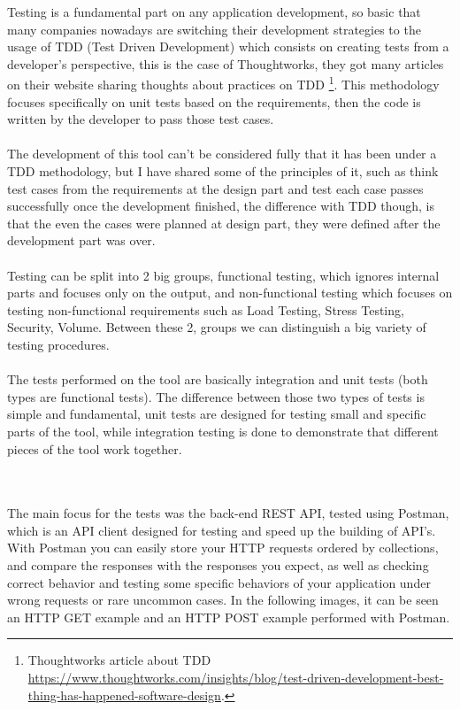 \documentclass{article}
\begin{document}
Testing is a fundamental part on any application development, so basic that many companies nowadays are switching their development strategies to the usage of \gls{TDD} (Test Driven Development) which consists on creating tests from a developer’s perspective, this is the case of Thoughtworks, they got many articles on their website sharing thoughts about practices on TDD \footnote{Thoughtworks article about TDD  \url{https://www.thoughtworks.com/insights/blog/test-driven-development-best-thing-has-happened-software-design}.}. This  methodology  focuses  specifically  on  unit  tests based on the requirements,  then  the  code  is  written  by  the developer to pass those test cases. 
~\\
~\\
The development of this tool can't be considered fully that it has been under a TDD methodology, but I have shared some of the principles of it, such as think test cases from the requirements at the design part and test each case passes successfully once the development finished, the difference with TDD though, is that the even the cases were planned at design part, they were defined after the development part was over.
~\\
~\\
Testing can be split into 2 big groups, functional testing, which ignores internal parts and focuses only on the output, and non-functional testing which focuses on testing non-functional requirements such as Load Testing, Stress Testing, Security, Volume. Between these 2, groups we can distinguish a big variety of testing procedures. 
~\\
~\\
The tests performed on the tool are basically integration and unit tests (both types are functional tests). The difference between those two types of tests is simple and fundamental, unit tests are designed for testing small and specific parts of the tool, while integration testing is done to demonstrate that different pieces of the tool work together. 

~\\
~\\
The main focus for the tests was the back-end REST API, tested using Postman, which is an API client designed for testing and speed up the building of API's. With Postman you can easily store your HTTP requests ordered by collections, and compare the responses with the responses you expect, as well as checking correct behavior and testing some specific behaviors of your application under wrong requests or rare uncommon cases. In the following images, it can be seen an HTTP GET example and an HTTP POST example performed with Postman.
\end{document}
